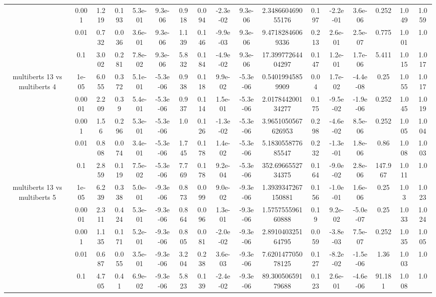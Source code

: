 \begin{tabular}{|c|c|c|c|c|c|c|c|c|c|c|c|c|c|c|c|c|}
 & 0.001 & 1.219 & 0.193 & 5.3e-01 & 9.3e-06 & 0.918 & 0.094 & -2.3e-02 & 9.3e-06 & 2.348660469055176 & 0.197 & -2.2e-01 & 3.6e-06 & 0.252 & 1.049 & 1.059 \\
 & 0.01 & 0.732 & 0.036 & 3.6e-01 & 9.3e-06 & 1.139 & 0.146 & -9.9e-03 & 9.3e-06 & 9.47182846069336 & 0.213 & 2.6e-01 & 2.5e-07 & 0.775 & 1.001 & 1.0 \\
 & 0.1 & 3.002 & 0.281 & 7.8e-02 & 9.3e-06 & 5.832 & 0.184 & -4.9e-02 & 9.3e-06 & 17.39977264404297 & 0.147 & 1.2e-01 & 1.7e-06 & 5.411 & 1.015 & 1.017 \\
\hline
\multirow{5}{*}{multiberts 13 vs multiberts 4} & 1e-05 & 6.055 & 0.372 & 5.1e-01 & -5.3e-06 & 0.938 & 0.118 & 9.9e-02 & -5.3e-06 & 0.54019945859909 & 0.04 & 1.7e-02 & -4.4e-08 & 0.25 & 1.055 & 1.017 \\
 & 0.0001 & 2.209 & 0.39 & 5.4e-01 & -5.3e-06 & 0.937 & 0.114 & 1.5e-01 & -5.3e-06 & 2.017844200134277 & 0.175 & -9.5e-02 & -1.9e-06 & 0.252 & 1.045 & 1.019 \\
 & 0.001 & 1.56 & 0.296 & 5.3e-01 & -5.3e-06 & 1.0 & 0.126 & -1.3e-02 & -5.3e-06 & 3.9651050567626953 & 0.298 & -4.6e-02 & 8.5e-06 & 0.252 & 1.005 & 1.004 \\
 & 0.01 & 0.808 & 0.074 & 3.4e-01 & -5.3e-06 & 1.745 & 0.178 & 1.4e-02 & -5.3e-06 & 5.183055877685547 & 0.232 & -1.3e-01 & 1.8e-06 & 0.86 & 1.008 & 1.003 \\
 & 0.1 & 2.859 & 0.119 & 7.5e-02 & -5.3e-06 & 7.769 & 0.178 & 9.2e-04 & -5.3e-06 & 352.6966552734375 & 0.164 & -9.0e-02 & 2.8e-06 & 147.967 & 1.011 & 1.0 \\
\hline
\multirow{5}{*}{multiberts 13 vs multiberts 5} & 1e-05 & 6.239 & 0.338 & 5.0e-01 & -9.3e-06 & 0.873 & 0.099 & 9.0e-02 & -9.3e-06 & 1.3939347267150881 & 0.156 & -1.0e-01 & 1.6e-06 & 0.25 & 1.03 & 1.023 \\
 & 0.0001 & 2.311 & 0.424 & 5.3e-01 & -9.3e-06 & 0.864 & 0.096 & 1.3e-01 & -9.3e-06 & 1.575755596160888 & 0.19 & 9.2e-02 & -5.0e-07 & 0.25 & 1.033 & 1.024 \\
 & 0.001 & 1.135 & 0.171 & 5.2e-01 & -9.3e-06 & 0.805 & 0.081 & -2.0e-02 & -9.3e-06 & 2.891040325164795 & 0.059 & -3.8e-03 & 7.5e-07 & 0.252 & 1.035 & 1.005 \\
 & 0.01 & 0.687 & 0.055 & 3.5e-01 & -9.3e-06 & 3.204 & 0.238 & 3.6e-03 & -9.3e-06 & 7.620147705078125 & 0.127 & -8.2e-02 & -1.5e-06 & 1.36 & 1.003 & 1.0 \\
 & 0.1 & 4.705 & 0.41 & 6.9e-02 & -9.3e-06 & 5.823 & 0.139 & -2.4e-02 & -9.3e-06 & 89.30050659179688 & 0.123 & 2.6e-01 & -4.6e-06 & 91.181 & 1.008 & 1.0 \\

\end{tabular}
